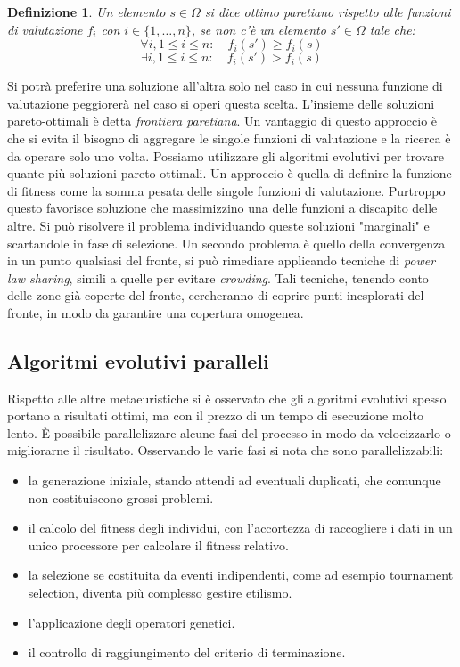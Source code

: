 \documentclass[10pt,a4paper]{article}
\newtheorem{definition}{Definizione}
\begin{document}
\begin{definition}
Un elemento $s \in \Omega$ si dice \emph{ottimo paretiano} rispetto alle funzioni di valutazione $f_i$ con $i \in \{1, \dots, n\}$, se non c'è un elemento $s' \in \Omega$ tale che:
$$
\forall i, 1 \leq i \leq n: \quad f_i(s') \geq f_i(s)
$$ 
$$
\exists i, 1 \leq i \leq n: \quad f_i(s') > f_i(s)
$$
\end{definition}

Si potrà preferire una soluzione all'altra solo nel caso in cui nessuna funzione di valutazione peggiorerà nel caso si operi questa scelta. L'insieme delle soluzioni pareto-ottimali è detta \emph{frontiera paretiana}. Un vantaggio di questo approccio è che si evita il bisogno di aggregare le singole funzioni di valutazione e la ricerca è da operare solo uno volta. Possiamo utilizzare gli algoritmi evolutivi per trovare quante più soluzioni pareto-ottimali. Un approccio è quella di definire la funzione di fitness come la somma pesata delle singole funzioni di valutazione. Purtroppo questo favorisce soluzione che massimizzino una delle funzioni a discapito delle altre. Si può risolvere il problema individuando queste soluzioni "marginali" e scartandole in fase di selezione. Un secondo problema è quello della convergenza in un punto qualsiasi del fronte, si può rimediare applicando tecniche di \emph{power law sharing}, simili a quelle per evitare \emph{crowding}. Tali tecniche, tenendo conto delle zone già coperte del fronte, cercheranno di coprire punti inesplorati del fronte, in modo da garantire una copertura omogenea.

\subsection{Algoritmi evolutivi paralleli}

Rispetto alle altre metaeuristiche si è osservato che gli algoritmi evolutivi spesso portano a risultati ottimi, ma con il prezzo di un tempo di esecuzione molto lento.
È possibile parallelizzare alcune fasi del processo in modo da velocizzarlo o migliorarne il risultato. Osservando le varie fasi si nota che sono parallelizzabili:

\begin{itemize}
\item{la generazione iniziale, stando attendi ad eventuali duplicati, che comunque non costituiscono grossi problemi.}
\item{il calcolo del fitness degli individui, con l’accortezza di raccogliere i dati in un unico processore per calcolare il fitness relativo.}
\item{la selezione se costituita da eventi indipendenti, come ad esempio tournament selection, diventa più complesso gestire etilismo.}
\item{l’applicazione degli operatori genetici.}
\item{il controllo di raggiungimento del criterio di terminazione.}
\end{itemize}
\end{document}
